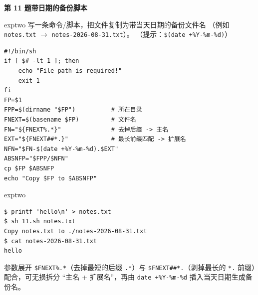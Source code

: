 \documentclass[11pt,a4paper,fontset=none]{ctexart}
\newcommand{\hwbanner}[3]{%
  \par\vspace{1.1em}
  \begin{tcolorbox}[enhanced, colback=#1!8, colframe=#1!75!black,
    boxrule=0.8pt, arc=2pt, left=7pt, right=7pt, top=4pt, bottom=4pt,
    before skip=1.1em]
    {\bfseries\color{#1!75!black}#2\qquad #3}
  \end{tcolorbox}
  \par\vspace{0.1em}\noindent\ignorespaces
}
\newcommand{\sublabel}[2]{%
  \par\vspace{0.8em}\noindent{\bfseries\color{#1!75!black}#2}\par\nobreak\vspace{0.25em}\noindent\ignorespaces
}
\begin{document}
\hwbanner{exptwo}{第 11 题}{带日期的备份脚本}
\begin{reqbox}{exptwo}
  写一条命令/脚本，把文件复制为带当天日期的备份文件名
  （例如 \texttt{notes.txt} $\rightarrow$ \texttt{notes-2026-08-31.txt}）。
  （提示：\texttt{\$(date +\%Y-\%m-\%d)}）
\end{reqbox}
\sublabel{exptwo}{\faCode\ 解答（\texttt{11.sh}）}
\begin{lstlisting}[style=shell]
#!/bin/sh
if [ $# -lt 1 ]; then
    echo "File path is required!"
    exit 1
fi
FP=$1
FPP=$(dirname "$FP")          # 所在目录
FNEXT=$(basename $FP)         # 文件名
FN="${FNEXT%.*}"              # 去掉后缀 -> 主名
EXT="${FNEXT##*.}"            # 最长前缀匹配 -> 扩展名
NFN="$FN-$(date +%Y-%m-%d).$EXT"
ABSNFP="$FPP/$NFN"
cp $FP $ABSNFP
echo "Copy $FP to $ABSNFP"
\end{lstlisting}
\begin{resbox}{exptwo}
\begin{lstlisting}[style=output]
$ printf 'hello\n' > notes.txt
$ sh 11.sh notes.txt
Copy notes.txt to ./notes-2026-08-31.txt
$ cat notes-2026-08-31.txt
hello
\end{lstlisting}
参数展开 \texttt{\${FNEXT\%.*}}（去掉最短的后缀 \texttt{.*}）与
\texttt{\${FNEXT\#\#*.}}（剥掉最长的 \texttt{*.} 前缀）配合，可无损拆分
“主名 + 扩展名”，再由 \texttt{date +\%Y-\%m-\%d} 插入当天日期生成备份名。
\end{resbox}
\end{document}
